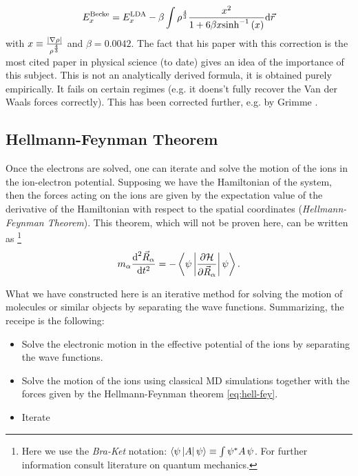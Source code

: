 \begin{equation}
E_x^{\text{Becke}} =  E_x^{\text{LDA}} -
 \beta \int {\rho^{\frac{4}{3}} \frac{x^2}{1+6\beta x \text{sinh}^{-1}\ensuremath{\left(x\right)}}  \text{d}\vec{r}  }
\end{equation}
with $x\equiv \frac{\left|\nabla\rho\right|}{\rho^{\frac{4}{3}}}$ and $\beta = 0.0042$. The fact that his paper with this correction is the most cited paper in physical science (to date) gives an idea of the importance of this subject. This is not an analytically derived formula, it is obtained purely empirically. It fails on certain regimes (e.g. it doens't fully recover the Van der Waals forces correctly). This has been corrected further, e.g. by Grimme \citep{grimme}.




\subsection{Hellmann-Feynman Theorem}


Once the electrons are solved, one can iterate and solve the motion of the ions in the ion-electron potential. Supposing we have the Hamiltonian of the system, then the forces acting on the ions are given by the expectation value of the derivative of the Hamiltonian with respect to the spatial coordinates (\emph{Hellmann-Feynman Theorem}). This theorem, which will not be proven here, can be written as \footnote{Here we use the \emph{Bra-Ket} notation: $\left<\psi\left|A\right|\psi\right> \equiv \int{\psi^* A \, \psi}$. For further information consult literature on quantum mechanics.}
\begin{equation}
m_{\alpha} \frac{\text{d}^2 \vec{R}_{\alpha}}{\text{d} t ^2} =
- \left<\psi\left|\frac{\partial \mathcal{H}}{\partial \vec{R}_{\alpha}}\right|\psi\right>.
\label{eq:hell-fey}
\end{equation}

What we have constructed here is an iterative method for solving the motion of molecules or similar objects by separating the wave functions. Summarizing, the receipe is the following:
\begin{itemize}
\item Solve the electronic motion in the effective potential of the ions by separating the wave functions.
\item Solve the motion of the ions using classical MD simulations together with the forces given by the Hellmann-Feynman theorem \eqref{eq:hell-fey}.
\item Iterate
\end{itemize}

